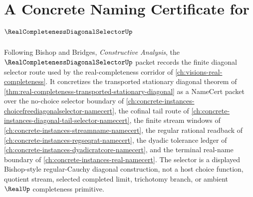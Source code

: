 \chapter{A Concrete Naming Certificate for $\RealCompletenessDiagonalSelectorUp$}
\label{ch:concrete-instances-real-completeness-diagonal-selector-namecert}

Following Bishop and Bridges, \emph{Constructive Analysis}, the $\RealCompletenessDiagonalSelectorUp$ packet records the finite diagonal selector route used by the real-completeness corridor of \autoref{ch:visions-real-completeness}. It concretizes the transported stationary diagonal theorem of \autoref{thm:real-completeness-transported-stationary-diagonal} as a NameCert packet over the no-choice selector boundary of \autoref{ch:concrete-instances-choicefreediagonalselector-namecert}, the cofinal tail route of \autoref{ch:concrete-instances-diagonal-tail-selector-namecert}, the finite stream windows of \autoref{ch:concrete-instances-streamname-namecert}, the regular rational readback of \autoref{ch:concrete-instances-regseqrat-namecert}, the dyadic tolerance ledger of \autoref{ch:concrete-instances-dyadicratcore-namecert}, and the terminal real-name boundary of \autoref{ch:concrete-instances-real-namecert}. The selector is a displayed Bishop-style regular-Cauchy diagonal construction, not a host choice function, quotient stream, selected completed limit, trichotomy branch, or ambient $\RealUp$ completeness primitive.

